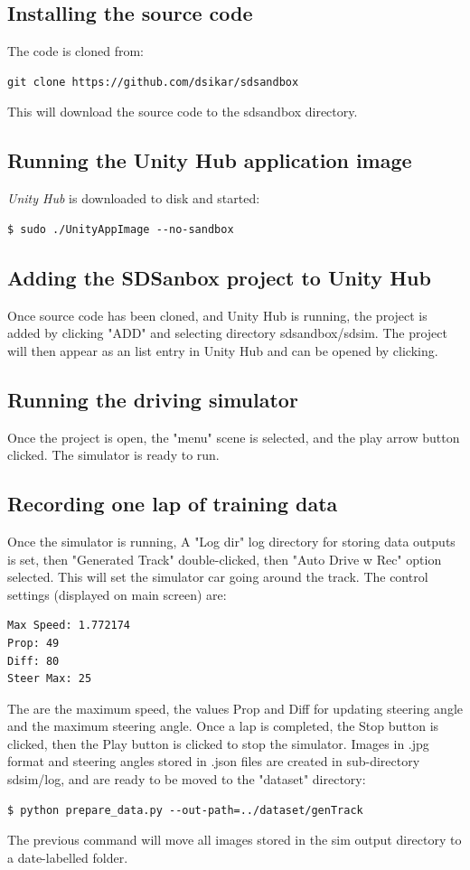 \subsection{Installing the source code}
\label{installing-source-code}
The code is cloned from:
\begin{verbatim}
git clone https://github.com/dsikar/sdsandbox    
\end{verbatim}
This will download the source code to the sdsandbox directory.

\subsection{Running the Unity Hub application image}
\label{running-unity-hub}

\textit{Unity Hub} is downloaded to disk and started:
\begin{verbatim}
$ sudo ./UnityAppImage --no-sandbox
\end{verbatim}

\subsection{Adding the SDSanbox project to Unity Hub}

Once source code has been cloned, and Unity Hub is running, the project is added by clicking "ADD" and selecting directory sdsandbox/sdsim. The project will then appear as an list entry in Unity Hub and can be opened by clicking.

\subsection{Running the driving simulator}
\label{running-driving simulator}
Once the project is open, the "menu" scene is selected, and the play arrow button clicked. The simulator is ready to run.

\subsection{Recording one lap of training data}
\label{recording-one-lap}
Once the simulator is running, A "Log dir" log directory for storing data outputs is set, then "Generated Track" double-clicked, then "Auto Drive w Rec" option selected. This will set the simulator car going around the track. 
The control settings (displayed on main screen) are:
\begin{verbatim}
Max Speed: 1.772174
Prop: 49
Diff: 80
Steer Max: 25
\end{verbatim}
The are the maximum speed, the values Prop and Diff for updating steering angle and the maximum steering angle. Once a lap is completed, the Stop button is clicked, then the Play button is clicked to stop the simulator.  
Images in .jpg format and steering angles stored in .json files are created in sub-directory sdsim/log, and are ready to be moved to the "dataset" directory:
\begin{verbatim}
$ python prepare_data.py --out-path=../dataset/genTrack
\end{verbatim}
The previous command will move all images stored in the sim output directory to a date-labelled folder.

